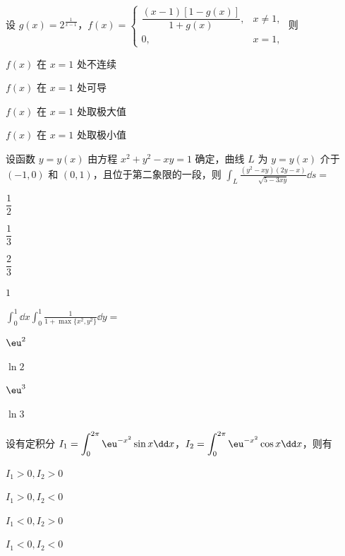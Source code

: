 
\begin{question}[index=1]
设 $g(x)=2^{\frac1{x-1}}$，$f(x)=\begin{cases}\dfrac{(x-1)[1-g(x)]}{1+g(x)},&x\ne1,\\0,&x=1,\end{cases}$ 则
\begin{choices}[columns=2]
\item $f(x)$ 在 $x=1$ 处不连续
\item $f(x)$ 在 $x=1$ 处可导
\item $f(x)$ 在 $x=1$ 处取极大值
\item $f(x)$ 在 $x=1$ 处取极小值
\end{choices}
\end{question}
\QuestionBreak

\begin{question}[index=2]
设函数 $y=y(x)$ 由方程 $x^2+y^2-xy=1$ 确定，曲线 $L$ 为 $y=y(x)$ 介于 $(-1,0)$ 和 $(0,1)$，且位于第二象限的一段，则 $\displaystyle\int_L\frac{(y^2-xy)(2y-x)}{\sqrt{5-3xy}}\dd s=$
\begin{choices}[columns=4]
\item $\dfrac12$
\item $\dfrac13$
\item $\dfrac23$
\item $1$
\end{choices}
\end{question}
\QuestionBreak

\begin{question}[index=3]
$\displaystyle\int_0^1\dd x\int_0^1\frac{1}{1+\max\{x^2,y^2\}}\dd y=$
\begin{choices}[columns=4]
\item $\eu^2$
\item $\ln2$
\item $\eu^3$
\item $\ln3$
\end{choices}
\end{question}
\QuestionBreak

\begin{question}[index=4]
设有定积分 $\displaystyle I_1=\int_0^{2\pi}\eu^{-x^2}\sin x\dd x$，$\displaystyle I_2=\int_0^{2\pi}\eu^{-x^2}\cos x\dd x$，则有
\begin{choices}[columns=4]
\item $I_1>0,I_2>0$
\item $I_1>0,I_2<0$
\item $I_1<0,I_2>0$
\item $I_1<0,I_2<0$
\end{choices}
\end{question}
\QuestionBreak

